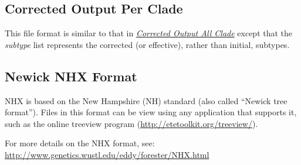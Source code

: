 \documentclass[letterpaper,10pt,english]{sphinxmanual}
\begin{document}
\subsection{Corrected Output Per Clade}
\label{defs:correctedperclade}\label{defs:corrected-output-per-clade}
This file format is similar to that in {\hyperref[defs:correctedall]{\emph{Corrected Output All Clade}}} except that the \emph{subtype} list represents the corrected (or effective), rather than initial, subtypes.


\subsection{Newick NHX Format}
\label{defs:newick-nhx-format}\label{defs:newick}
NHX is based on the New Hampshire (NH) standard (also called ``Newick tree format'').
Files in this format can be view using any application that supports it, such as the online treeview program (\href{http://etetoolkit.org/treeview/}{http://etetoolkit.org/treeview/}).

For more details on the NHX format, see: \href{http://www.genetics.wustl.edu/eddy/forester/NHX.html}{http://www.genetics.wustl.edu/eddy/forester/NHX.html}



\renewcommand{\indexname}{Index}
\printindex
\end{document}
